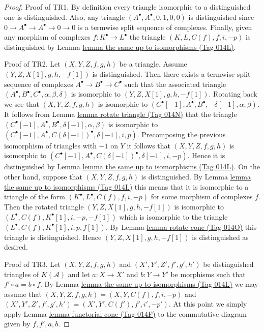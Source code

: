 \documentclass{amsart}
\theoremstyle{plain}
\theoremstyle{definition}
\theoremstyle{remark}
\numberwithin{equation}{subsection}
\begin{document}
\begin{proof}
Proof of TR1. By definition every triangle isomorphic to a distinguished
one is distinguished. Also, any triangle $(A^\bullet, A^\bullet, 0, 1, 0, 0)$
is distinguished since $0 \to A^\bullet \to A^\bullet \to 0 \to 0$ is
a termwise split sequence of complexes. Finally, given any morphism of
complexes $f : K^\bullet \to L^\bullet$ the triangle
$(K, L, C(f), f, i, -p)$ is distinguished by
Lemma \href{https://stacks.math.columbia.edu/tag/014L}{lemma the same up to isomorphisms (Tag 014L)}.

\medskip\noindent
Proof of TR2. Let $(X, Y, Z, f, g, h)$ be a triangle.
Assume $(Y, Z, X[1], g, h, -f[1])$ is distinguished.
Then there exists a termwise split sequence of complexes
$A^\bullet \to B^\bullet \to C^\bullet$ such that the associated
triangle $(A^\bullet, B^\bullet, C^\bullet, \alpha, \beta, \delta)$
is isomorphic to $(Y, Z, X[1], g, h, -f[1])$. Rotating back we see
that $(X, Y, Z, f, g, h)$ is isomorphic to
$(C^\bullet[-1], A^\bullet, B^\bullet, -\delta[-1], \alpha, \beta)$.
It follows from Lemma \href{https://stacks.math.columbia.edu/tag/014N}{lemma rotate triangle (Tag 014N)} that the triangle
$(C^\bullet[-1], A^\bullet, B^\bullet, \delta[-1], \alpha, \beta)$
is isomorphic to
$(C^\bullet[-1], A^\bullet, C(\delta[-1])^\bullet, \delta[-1], i, p)$.
Precomposing the previous isomorphism of triangles with $-1$ on $Y$
it follows that $(X, Y, Z, f, g, h)$ is isomorphic to
$(C^\bullet[-1], A^\bullet, C(\delta[-1])^\bullet, \delta[-1], i, -p)$.
Hence it is distinguished by
Lemma \href{https://stacks.math.columbia.edu/tag/014L}{lemma the same up to isomorphisms (Tag 014L)}.
On the other hand, suppose that $(X, Y, Z, f, g, h)$ is distinguished.
By Lemma \href{https://stacks.math.columbia.edu/tag/014L}{lemma the same up to isomorphisms (Tag 014L)} this means that it is
isomorphic to a triangle of the form
$(K^\bullet, L^\bullet, C(f), f, i, -p)$ for some morphism of
complexes $f$. Then the rotated triangle $(Y, Z, X[1], g, h, -f[1])$ is
isomorphic to $(L^\bullet, C(f), K^\bullet[1], i, -p, -f[1])$ which is
isomorphic to the triangle $(L^\bullet, C(f), K^\bullet[1], i, p, f[1])$.
By Lemma \href{https://stacks.math.columbia.edu/tag/014O}{lemma rotate cone (Tag 014O)} this triangle is distinguished.
Hence $(Y, Z, X[1], g, h, -f[1])$ is distinguished as desired.

\medskip\noindent
Proof of TR3. Let
$(X, Y, Z, f, g, h)$ and $(X', Y', Z', f', g', h')$
be distinguished triangles of $K(\mathcal{A})$
and let $a : X \to X'$ and $b : Y \to Y'$ be morphisms
such that $f' \circ a = b \circ f$. By
Lemma \href{https://stacks.math.columbia.edu/tag/014L}{lemma the same up to isomorphisms (Tag 014L)} we may assume that
$(X, Y, Z, f, g, h) = (X, Y, C(f), f, i, -p)$ and
$(X', Y', Z', f', g', h') = (X', Y', C(f'), f', i', -p')$.
At this point we simply apply Lemma \href{https://stacks.math.columbia.edu/tag/014F}{lemma functorial cone (Tag 014F)}
to the commutative diagram given by $f, f', a, b$.


\end{proof}
\end{document}
